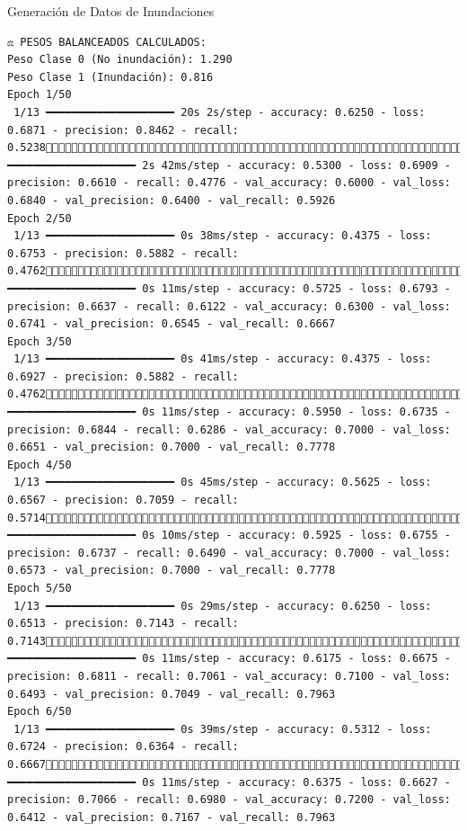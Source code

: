 \documentclass[
  ignorenonframetext,
]{beamer}
\begin{document}
\begin{frame}[fragile]{Generación de Datos de Inundaciones}
\begin{verbatim}
⚖️ PESOS BALANCEADOS CALCULADOS:
Peso Clase 0 (No inundación): 1.290
Peso Clase 1 (Inundación): 0.816
Epoch 1/50
 1/13 ━━━━━━━━━━━━━━━━━━━━ 20s 2s/step - accuracy: 0.6250 - loss: 0.6871 - precision: 0.8462 - recall: 0.523813/13 ━━━━━━━━━━━━━━━━━━━━ 2s 42ms/step - accuracy: 0.5300 - loss: 0.6909 - precision: 0.6610 - recall: 0.4776 - val_accuracy: 0.6000 - val_loss: 0.6840 - val_precision: 0.6400 - val_recall: 0.5926
Epoch 2/50
 1/13 ━━━━━━━━━━━━━━━━━━━━ 0s 38ms/step - accuracy: 0.4375 - loss: 0.6753 - precision: 0.5882 - recall: 0.476213/13 ━━━━━━━━━━━━━━━━━━━━ 0s 11ms/step - accuracy: 0.5725 - loss: 0.6793 - precision: 0.6637 - recall: 0.6122 - val_accuracy: 0.6300 - val_loss: 0.6741 - val_precision: 0.6545 - val_recall: 0.6667
Epoch 3/50
 1/13 ━━━━━━━━━━━━━━━━━━━━ 0s 41ms/step - accuracy: 0.4375 - loss: 0.6927 - precision: 0.5882 - recall: 0.476213/13 ━━━━━━━━━━━━━━━━━━━━ 0s 11ms/step - accuracy: 0.5950 - loss: 0.6735 - precision: 0.6844 - recall: 0.6286 - val_accuracy: 0.7000 - val_loss: 0.6651 - val_precision: 0.7000 - val_recall: 0.7778
Epoch 4/50
 1/13 ━━━━━━━━━━━━━━━━━━━━ 0s 45ms/step - accuracy: 0.5625 - loss: 0.6567 - precision: 0.7059 - recall: 0.571413/13 ━━━━━━━━━━━━━━━━━━━━ 0s 10ms/step - accuracy: 0.5925 - loss: 0.6755 - precision: 0.6737 - recall: 0.6490 - val_accuracy: 0.7000 - val_loss: 0.6573 - val_precision: 0.7000 - val_recall: 0.7778
Epoch 5/50
 1/13 ━━━━━━━━━━━━━━━━━━━━ 0s 29ms/step - accuracy: 0.6250 - loss: 0.6513 - precision: 0.7143 - recall: 0.714313/13 ━━━━━━━━━━━━━━━━━━━━ 0s 11ms/step - accuracy: 0.6175 - loss: 0.6675 - precision: 0.6811 - recall: 0.7061 - val_accuracy: 0.7100 - val_loss: 0.6493 - val_precision: 0.7049 - val_recall: 0.7963
Epoch 6/50
 1/13 ━━━━━━━━━━━━━━━━━━━━ 0s 39ms/step - accuracy: 0.5312 - loss: 0.6724 - precision: 0.6364 - recall: 0.666713/13 ━━━━━━━━━━━━━━━━━━━━ 0s 11ms/step - accuracy: 0.6375 - loss: 0.6627 - precision: 0.7066 - recall: 0.6980 - val_accuracy: 0.7200 - val_loss: 0.6412 - val_precision: 0.7167 - val_recall: 0.7963

\end{verbatim}
\end{frame}
\end{document}
